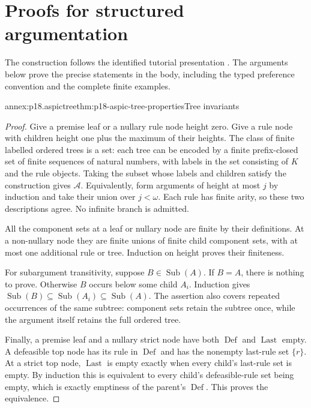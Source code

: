 \section{Proofs for structured argumentation}
\label{sec:annex-p18-structured-argumentation}

The construction follows the identified tutorial presentation
\cite[Sections 3 and 5]{ModgilPrakken2014ASPICTutorial}.
The arguments below prove the precise statements in the body, including
the typed preference convention and the complete finite examples.

\begin{annexitem}{annex:p18.aspictree}{thm:p18-aspic-tree-properties}{Tree invariants}
\begin{proof}
Give a premise leaf or a nullary rule node height zero. Give a rule node
with children height one plus the maximum of their heights. The class of
finite labelled ordered trees is a set: each tree can be encoded by a finite
prefix-closed set of finite sequences of natural numbers, with labels in the
set consisting of \(K\) and the rule objects. Taking the subset whose labels
and children satisfy the construction gives \(\mathcal A\).
Equivalently, form arguments of height at most \(j\) by induction and take
their union over \(j<\omega\). Each rule has finite arity, so these two
descriptions agree. No infinite branch is admitted.

All the component sets at a leaf or nullary node are finite by their
definitions. At a non-nullary node they are finite unions of finite child
component sets, with at most one additional rule or tree. Induction on height
proves their finiteness.

For subargument transitivity, suppose \(B\in\operatorname{Sub}(A)\).
If \(B=A\), there is nothing to prove. Otherwise \(B\) occurs below some
child \(A_i\). Induction gives
\(\operatorname{Sub}(B)\subseteq\operatorname{Sub}(A_i)
\subseteq\operatorname{Sub}(A)\).
The assertion also covers repeated occurrences of the same subtree:
component sets retain the subtree once, while the argument itself retains
the full ordered tree.

Finally, a premise leaf and a nullary strict node have both
\(\operatorname{Def}\) and \(\operatorname{Last}\) empty.
A defeasible top node has its rule in \(\operatorname{Def}\) and has the
nonempty last-rule set \(\{r\}\). At a strict top node,
\(\operatorname{Last}\) is empty exactly when every child's last-rule set
is empty. By induction this is equivalent to every child's defeasible-rule
set being empty, which is exactly emptiness of the parent's
\(\operatorname{Def}\). This proves the equivalence.
\end{proof}
\end{annexitem}

